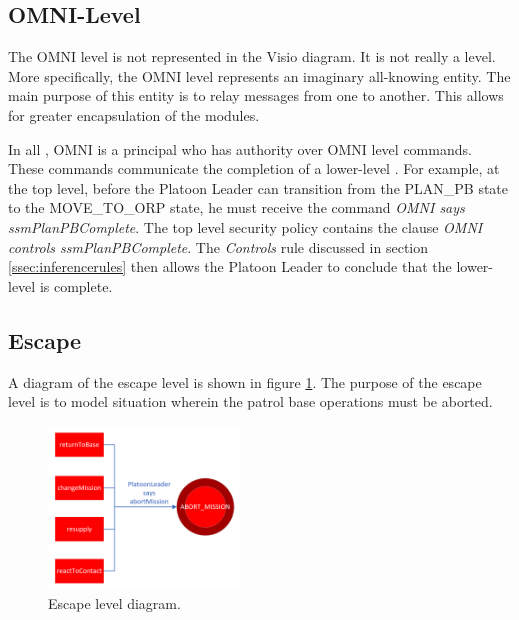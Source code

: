 \documentclass[../../main/main.tex]{subfiles}
\begin{document}
\subsection{OMNI-Level}\label{ssec:omnilevel}
The OMNI level is not represented in the Visio diagram.  It is not really a level.  More specifically, the OMNI level represents an imaginary all-knowing entity.  The main purpose of this entity is to relay messages from one  to another.  This allows for greater encapsulation of the modules. 

In all , OMNI is a principal who has authority over OMNI level commands.  These commands communicate the completion of a lower-level .  For example, at the top level, before the Platoon Leader can transition from the PLAN_PB state to the MOVE_TO_ORP state, he must receive the command \textit{OMNI says ssmPlanPBComplete}.  The top level security policy contains the clause \textit{OMNI controls ssmPlanPBComplete}.  The \textit{Controls} rule discussed in section \ref{ssec:inferencerules} then allows the Platoon Leader to conclude that the lower-level  is complete.  
\clearpage

\subsection{Escape}\label{ssec:escape}
A diagram of the escape level is shown in figure \ref{escapeDiagram}.  The purpose of the escape level is to model situation wherein the patrol base operations must be aborted.  

\begin{figure}[h!]
\centering
\includegraphics[width=0.45\textwidth]{../figures/escapeDiagram}
\caption{\label{escapeDiagram} Escape level diagram.}
\end{figure}
\end{document}
